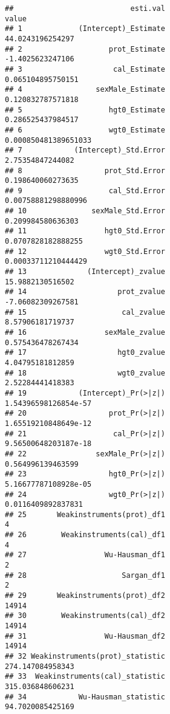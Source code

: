 \documentclass[
]{book}
\begin{document}
\begin{verbatim}
##                           esti.val                               value
## 1             (Intercept)_Estimate                    44.0243196254297
## 2                    prot_Estimate                    -1.4025623247106
## 3                     cal_Estimate                   0.065104895750151
## 4                 sexMale_Estimate                   0.120832787571818
## 5                    hgt0_Estimate                   0.286525437984517
## 6                    wgt0_Estimate                0.000850481389651033
## 7            (Intercept)_Std.Error                    2.75354847244082
## 8                   prot_Std.Error                   0.198640060273635
## 9                    cal_Std.Error                 0.00758881298880996
## 10               sexMale_Std.Error                   0.209984580636303
## 11                  hgt0_Std.Error                  0.0707828182888255
## 12                  wgt0_Std.Error                 0.00033711210444429
## 13              (Intercept)_zvalue                    15.9882130516502
## 14                     prot_zvalue                   -7.06082309267581
## 15                      cal_zvalue                    8.57906181719737
## 16                  sexMale_zvalue                   0.575436478267434
## 17                     hgt0_zvalue                    4.04795181812859
## 18                     wgt0_zvalue                    2.52284441418383
## 19            (Intercept)_Pr(>|z|)                1.54396598126854e-57
## 20                   prot_Pr(>|z|)                1.65519210848649e-12
## 21                    cal_Pr(>|z|)                9.56500648203187e-18
## 22                sexMale_Pr(>|z|)                   0.564996139463599
## 23                   hgt0_Pr(>|z|)                5.16677787108928e-05
## 24                   wgt0_Pr(>|z|)                  0.0116409892837831
## 25       Weakinstruments(prot)_df1                                   4
## 26        Weakinstruments(cal)_df1                                   4
## 27                  Wu-Hausman_df1                                   2
## 28                      Sargan_df1                                   2
## 29       Weakinstruments(prot)_df2                               14914
## 30        Weakinstruments(cal)_df2                               14914
## 31                  Wu-Hausman_df2                               14914
## 32 Weakinstruments(prot)_statistic                    274.147084958343
## 33  Weakinstruments(cal)_statistic                    315.036848606231
## 34            Wu-Hausman_statistic                    94.7020085425169

\end{verbatim}
\end{document}
